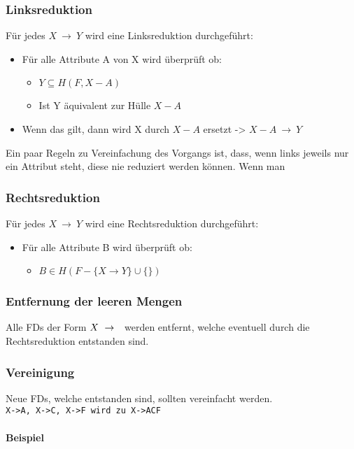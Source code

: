 \documentclass{article}
\newcommand{\paragraphlb}[1]{\paragraph{#1}\mbox{}\\}
\begin{document}
	\subsubsection{Linksreduktion}
	Für jedes $X\ \to\ Y$ wird eine Linksreduktion durchgeführt:
	\begin{itemize}
		\item{Für alle Attribute A von X wird überprüft ob:}
		\begin{itemize}
			\item{$Y \subseteq H(F, X - A)$}
			\item{Ist Y äquivalent zur Hülle $X-A$}
		\end{itemize}
		\item{Wenn das gilt, dann wird X durch $X-A$ ersetzt -> $X-A\ \to\ Y$}
	\end{itemize}
	Ein paar Regeln zu Vereinfachung des Vorgangs ist, dass, wenn links jeweils nur ein Attribut steht, diese nie reduziert werden können.
	Wenn man
	\subsubsection{Rechtsreduktion}
	Für jedes $X\ \to\ Y$ wird eine Rechtsreduktion durchgeführt:
	\begin{itemize}
		\item{Für alle Attribute B wird überprüft ob:}
		\begin{itemize}
			\item{$B\in H(F-\{X\to Y\}\cup \{\})$}
		\end{itemize}
	\end{itemize}
	\subsubsection{Entfernung der leeren Mengen}
	Alle FDs der Form $X\ \to\ \null$ werden entfernt, welche eventuell durch die Rechtsreduktion entstanden sind.
	\subsubsection{Vereinigung}
	Neue FDs, welche entstanden sind, sollten vereinfacht werden. \\
	\verb|X->A, X->C, X->F wird zu X->ACF|
	\paragraphlb{Beispiel}
\end{document}
